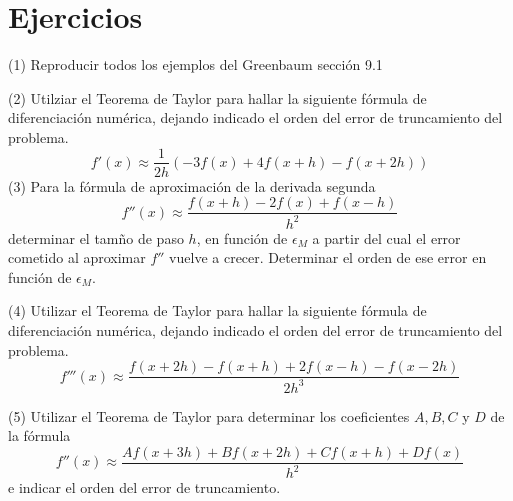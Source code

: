 \section*{Ejercicios}
\noindent (1) Reproducir todos los ejemplos del Greenbaum sección 9.1

\noindent (2) Utilziar el Teorema de Taylor para hallar la siguiente fórmula de diferenciación numérica, dejando indicado el orden del error de truncamiento del problema.
\[ f'(x) \approx \frac{1}{2h} (-3f(x) + 4f(x + h) - f(x + 2h)) \]
\noindent (3) Para la fórmula de aproximación de la derivada segunda
\[ f''(x) \approx \frac{f(x + h) - 2f(x) + f(x -h)}{h^2} \]
determinar el tamño de paso $h$, en función de $\epsilon_M$ a partir del cual el error cometido al aproximar $f''$ vuelve a crecer. Determinar el orden de ese error en función de $\epsilon_M$.

\noindent (4) Utilizar el Teorema de Taylor para hallar la siguiente fórmula de diferenciación numérica, dejando indicado el orden del error de truncamiento del problema.
\[ f'''(x) \approx \frac{f(x + 2h) - f(x + h) + 2f(x - h) - f(x - 2h)}{2h^3} \]

\noindent (5) Utilizar el Teorema de Taylor para determinar los coeficientes $A, B, C$ y $D$ de la fórmula
\[ f''(x) \approx \frac{Af(x + 3h) + Bf(x + 2h) + Cf(x + h) + Df(x)}{h^2} \]
e indicar el orden del error de truncamiento.